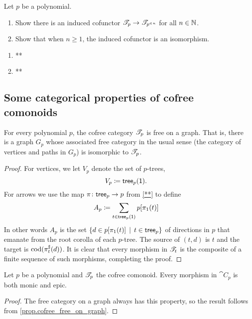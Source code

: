\documentclass[Book-Poly]{subfiles}
\begin{document}

\begin{exercise}
Let $p$ be a polynomial.
\begin{enumerate}
    \item Show there is an induced cofunctor $\mathscr{T}_{p} \to \mathscr{T}_{p^{\mathbin{\triangleleft}\,n}}$ for all $n\in\mathbb{N}$.
    \item Show that when $n\geq1$, the induced cofunctor is an isomorphism. \qedhere
\end{enumerate}
\begin{solution}
\begin{enumerate}
    \item **
    \item **
\end{enumerate}
\end{solution}
\end{exercise}

\subsection{Some categorical properties of cofree comonoids}

\begin{proposition}\label{prop.cofree_free_on_graph}
For every polynomial $p$, the cofree category $\mathscr{T}_{p}$ is free on a graph. That is, there is a graph $G_p$ whose associated free category in the usual sense (the category of vertices and paths in $G_p$) is isomorphic to $\mathscr{T}_{p}$.
\end{proposition}
\begin{proof}
For vertices, we let $V_p$ denote the set of $p$-trees,
\[V_p\coloneqq\mathsf{tree}_p(\textsf{1}).\]
For arrows we use the map $\pi\colon\mathsf{tree}_p\to p$ from \cref{**} to define
\[
A_p\coloneqq\sum_{t\in\mathsf{tree}_p(\textsf{1})}p[\pi_1(t)]
\]
In other words $A_p$ is the set $\{d\in p[\pi_1(t)]\,\mid\,t\in\mathsf{tree}_p\}$ of directions in $p$ that emanate from the root corolla of each $p$-tree. The source of $(t,d)$ is $t$ and the target is $\operatorname{cod}(\pi^\sharp_t(d))$. It is clear that every morphism in $\mathscr{T}_{t}$ is the composite of a finite sequence of such morphisms, completing the proof.
\end{proof}


\begin{corollary}
Let $p$ be a polynomial and $\mathscr{T}_{p}$ the cofree comonoid. Every morphism in $\cat{C}_p$ is both monic and epic.
\end{corollary}
\begin{proof}
The free category on a graph always has this property, so the result follows from \cref{prop.cofree_free_on_graph}.
\end{proof}
\end{document}
